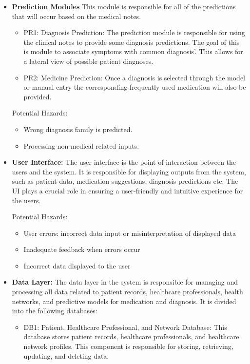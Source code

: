 \documentclass{article}
\begin{document}
\begin{itemize}
    \item \textbf{Prediction Modules}
    This module is responsible for all of the predictions that will occur based on the medical notes.

    \begin{itemize}
        \item PR1: Diagnosis Prediction: The prediction module is responsible for using the clinical notes to provide some diagnosis predictions. The goal of this is module to associate symptoms with common diagnosis'. This allows for a lateral view of possible patient diagnoses.
        \item PR2: Medicine Prediction: Once a diagnosis is selected through the model or manual entry the corresponding frequently used medication will also be provided.
    \end{itemize}
    
    Potential Hazards:
    \begin{itemize}
        \item Wrong diagnosis family is predicted.
        \item Processing non-medical related inputs.
    \end{itemize}
 
    \item \textbf{User Interface:}
    The user interface is the point of interaction between the users and the system. It is responsible for displaying outputs from the system, such as patient data, medication suggestions, diagnosis predictions etc. The UI plays a crucial role in ensuring a user-friendly and intuitive experience for the users.
    
    Potential Hazards:
    \begin{itemize}
        \item User errors: incorrect data input or misinterpretation of displayed data
        \item Inadequate feedback when errors occur
        \item Incorrect data displayed to the user
    \end{itemize}

    \item \textbf{Data Layer:}
    The data layer in the system is responsible for managing and processing all data related to patient records, healthcare professionals, health networks, and predictive models for medication and diagnosis. It is divided into the following databases:
    \begin{itemize}
        \item DB1: Patient, Healthcare Professional, and Network Database: This database stores patient records, healthcare professionals, and healthcare network profiles. This component is responsible for storing, retrieving, updating, and deleting data. 


\end{itemize}
\end{itemize}
\end{document}
